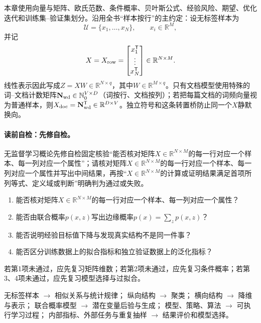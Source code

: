 \begin{prerequisitebox}
本章使用向量与矩阵、欧氏范数、条件概率、贝叶斯公式、经验风险、期望、优化迭代和训练集--验证集划分。沿用全书“样本按行”的主约定：设无标签样本为
\[
\mathcal U=\{x_1,\ldots,x_N\},\qquad x_i\in\mathbb R^M,
\]
并记
\[
X=X_{\rm row}=
\begin{bmatrix}x_1^{\mathsf T}\\ \vdots\\ x_N^{\mathsf T}\end{bmatrix}
\in\mathbb R^{N\times M}.
\]
线性表示因此写成$Z=XW\in\mathbb R^{N\times q}$，其中$W\in\mathbb R^{M\times q}$。只有文档模型使用特殊的词--文档计数矩阵$\mathbf N_{\rm wd}\in\mathbb N_0^{V\times D}$（词按行、文档按列）；若把每篇文档的词频向量视为普通样本，则$X_{\rm doc}=\mathbf N_{\rm wd}^{\mathsf T}\in\mathbb R^{D\times V}$。独立符号和这条转置桥防止同一个$X$静默换向。
\end{prerequisitebox}

\label{struct:V4-C01-CH03}
\paragraph{读前自检：先修自检。}无监督学习概论先修自检固定核验“能否核对矩阵$X\in\mathbb R^{N\times M}$的每一行对应一个样本、每一列对应一个属性”；请核对矩阵$X\in\mathbb R^{N\times M}$的每一行对应一个样本、每一列对应一个属性并写出中间结果，再按“$X\in\mathbb R^{N\times M}$的计算或证明结果满足首项所列等式、定义域或判断”明确判为通过或失败。\par

\begin{precheckbox}
\begin{enumerate}[leftmargin=2.2em]
  \item 能否核对矩阵$X\in\mathbb R^{N\times M}$的每一行对应一个样本、每一列对应一个属性？
  \item 能否由联合概率$p(x,z)$写出边缘概率$p(x)=\sum_zp(x,z)$？
  \item 能否说明经验目标值下降与发现真实结构不是同一件事？
  \item 能否区分训练数据上的拟合指标和独立验证数据上的泛化指标？
\end{enumerate}
若第1项未通过，应先复习矩阵维数；若第2项未通过，应先复习条件概率；若第3、4项未通过，应先复习模型选择与过拟合。
\end{precheckbox}

\label{struct:V4-C01-CH04}
\begin{dependencybox}
无标签样本 $\to$ 相似关系与统计规律；
纵向结构 $\to$ 聚类；
横向结构 $\to$ 降维与表示；
联合概率模型 $\to$ 潜在变量后验与生成；
模型、策略、算法 $\to$ 可执行学习过程；
内部指标、外部任务与重复抽样 $\to$ 结果评价和模型选择。
\end{dependencybox}

